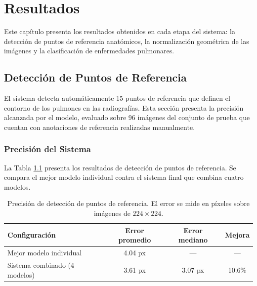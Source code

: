 
\chapter{Resultados}
\label{cap:resultados}

Este capítulo presenta los resultados obtenidos en cada etapa del sistema: la detección de puntos de referencia anatómicos, la normalización geométrica de las imágenes y la clasificación de enfermedades pulmonares.

\section{Detección de Puntos de Referencia}
\label{sec:resultados_landmarks}

El sistema detecta automáticamente 15 puntos de referencia que definen el contorno de los pulmones en las radiografías. Esta sección presenta la precisión alcanzada por el modelo, evaluado sobre 96 imágenes del conjunto de prueba que cuentan con anotaciones de referencia realizadas manualmente.

\subsection{Precisión del Sistema}
\label{subsec:desempeno_ensemble}

La Tabla \ref{tab:resultados_ensemble_landmarks} presenta los resultados de detección de puntos de referencia. Se compara el mejor modelo individual contra el sistema final que combina cuatro modelos.

\begin{table}[htbp]
    \centering
    \caption{Precisión de detección de puntos de referencia. El error se mide en píxeles sobre imágenes de $224 \times 224$.}
    \label{tab:resultados_ensemble_landmarks}
    \small
    \begin{tabular}{@{}lccc@{}}
        \toprule
        \textbf{Configuración} & \textbf{Error promedio} & \textbf{Error mediano} & \textbf{Mejora} \\
        \midrule
        Mejor modelo individual & 4.04 px & --- & --- \\
        Sistema combinado (4 modelos) & 3.61 px & 3.07 px & 10.6\% \\
        \bottomrule
    \end{tabular}
\end{table}


